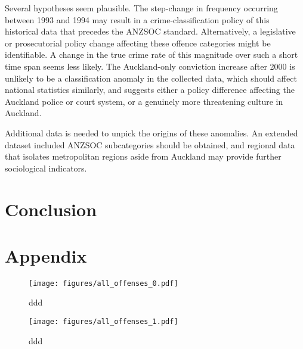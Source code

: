 \documentclass[onecolumn]{myarticle}
\begin{document}
Several hypotheses seem plausible.  
The step-change in frequency occurring between 1993 and 1994 may result in a crime-classification policy of this historical data that precedes the ANZSOC standard.
Alternatively, a legislative or prosecutorial policy change affecting these offence categories might be identifiable.
A change in the true crime rate of this magnitude over such a short time span seems less likely.
The Auckland-only conviction increase after 2000 is unlikely to be a classification anomaly in the collected data, which should affect national statistics similarly, and suggests either a policy difference affecting the Auckland police or court system, or a genuinely more threatening culture in Auckland.

Additional data is needed to unpick the origins of these anomalies.
An extended dataset included ANZSOC subcategories should be obtained, and regional data that isolates metropolitan regions aside from Auckland may provide further sociological indicators.

\section*{Conclusion}

\section*{Appendix}

\begin{figure}
  \centering
  \caption{ddd}
  \texttt{[image: figures/all\_offenses\_0.pdf]}
\end{figure}

\begin{figure}
  \centering
  \caption{ddd}
  \texttt{[image: figures/all\_offenses\_1.pdf]}
\end{figure}
\end{document}
